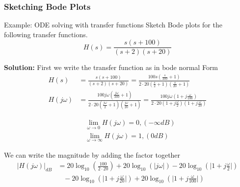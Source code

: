 \subsubsection{Sketching Bode Plots}
\begin{exampleblock}{Example: ODE solving with transfer functions}
Sketch Bode plots for the following transfer functions.
\begin{equation*}
    H(s) = \frac{s(s+100)}{(s+2)(s+20)}
\end{equation*}

\textbf{Solution:}
First we write the transfer function as in bode normal Form
\begin{align*}
    H(s) &= \frac{s(s+100)}{(s+2)(s+20)} 
     = \frac{100 s(\frac{s}{100}+1)}{2\cdot20(\frac{s}{2}+1)(\frac{s}{20}+1)} \\
    H(j\omega) &= \frac{100 j\omega(\frac{j\omega}{100}+1)}{2\cdot 20(\frac{j\omega}{2}+1)(\frac{j\omega}{20}+1)}
     = \frac{100 j\omega(1+j\frac{\omega}{100})}{2\cdot 20(1+j\frac{\omega}{2})(1+j\frac{\omega}{20})}
\end{align*}

\begin{align*}
    &\lim_{\omega\to 0} H(j\omega) = 0, (-\infty dB) \\
    &\lim_{\omega\to \infty} H(j\omega) = 1, (0 dB)
\end{align*}

We can write the magnitude by adding the factor together
\begin{align*}
    |H(j\omega)|_{dB} &= 20\log_{10}(\frac{100}{2\cdot 20})
    +20\log_{10}(|j\omega|) 
    -20\log_{10}(\big| 1+j\frac{\omega}{2}\big|) \\
    &\;\;\; -20\log_{10}(\big| 1+j\frac{\omega}{20}\big|)
    +20\log_{10}(\big| 1+j\frac{\omega}{100}\big|)
\end{align*}


\end{exampleblock}
